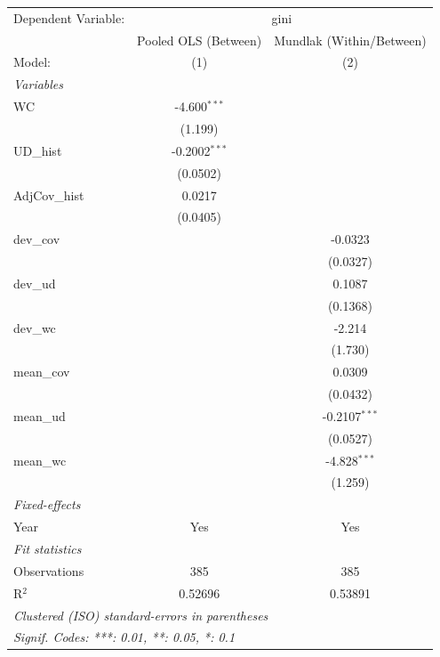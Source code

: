 
\begingroup
\centering
\begin{tabular}{lcc}
   \tabularnewline \midrule \midrule
   Dependent Variable: & \multicolumn{2}{c}{gini}\\
                 & Pooled OLS (Between) & Mundlak (Within/Between) \\   
   Model:        & (1)                  & (2)\\  
   \midrule
   \emph{Variables}\\
   WC            & -4.600$^{***}$       &   \\   
                 & (1.199)              &   \\   
   UD\_hist      & -0.2002$^{***}$      &   \\   
                 & (0.0502)             &   \\   
   AdjCov\_hist  & 0.0217               &   \\   
                 & (0.0405)             &   \\   
   dev\_cov      &                      & -0.0323\\   
                 &                      & (0.0327)\\   
   dev\_ud       &                      & 0.1087\\   
                 &                      & (0.1368)\\   
   dev\_wc       &                      & -2.214\\   
                 &                      & (1.730)\\   
   mean\_cov     &                      & 0.0309\\   
                 &                      & (0.0432)\\   
   mean\_ud      &                      & -0.2107$^{***}$\\   
                 &                      & (0.0527)\\   
   mean\_wc      &                      & -4.828$^{***}$\\   
                 &                      & (1.259)\\   
   \midrule
   \emph{Fixed-effects}\\
   Year          & Yes                  & Yes\\  
   \midrule
   \emph{Fit statistics}\\
   Observations  & 385                  & 385\\  
   R$^2$         & 0.52696              & 0.53891\\  
   \midrule \midrule
   \multicolumn{3}{l}{\emph{Clustered (ISO) standard-errors in parentheses}}\\
   \multicolumn{3}{l}{\emph{Signif. Codes: ***: 0.01, **: 0.05, *: 0.1}}\\
\end{tabular}
\par\endgroup


